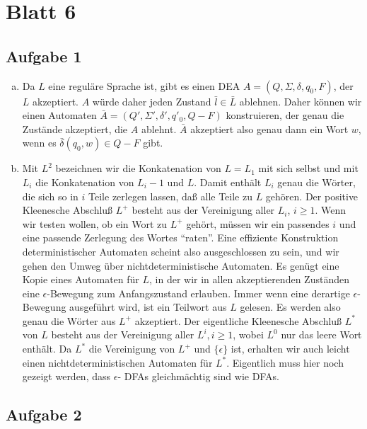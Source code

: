 \section*{Blatt 6}
%

\subsection*{Aufgabe 1}

\begin{enumerate}[a)]
  \item Da $L$ eine reguläre Sprache ist, gibt es einen DEA $A = (Q, \Sigma, \delta, q_0, F)$, der $L$ akzeptiert. $A$ würde daher jeden Zustand $\bar{l} \in \bar{L}$ ablehnen. Daher können wir einen Automaten $\bar{A} = (Q', \Sigma', \delta', q'_0, Q-F)$ konstruieren, der genau die Zustände akzeptiert, die $A$ ablehnt. $\bar{A}$ akzeptiert also genau dann ein Wort $w$, wenn es $\bar{\delta}(q_0, w) \in Q-F$ gibt.

  \item Mit $L^2$ bezeichnen wir die Konkatenation von
   $L = L_1$ mit sich selbst und mit $L_i$ die Konkatenation
   von $L_i-1$ und $L$. Damit enthält $L_i$ genau die Wörter,
    die sich so in $i$ Teile zerlegen lassen, daß alle Teile
    zu $L$ gehören. Der positive Kleenesche Abschluß $L^{+}$
    besteht aus der Vereinigung aller $L_i$, $i \geq 1$. Wenn
     wir testen wollen, ob ein Wort zu $L^{+}$ gehört, müssen
     wir ein passendes $i$ und eine passende Zerlegung des Wortes
      ``raten''. Eine effiziente Konstruktion deterministischer
      Automaten scheint also ausgeschlossen zu sein, und wir gehen
       den Umweg über nichtdeterministische Automaten. Es genügt
       eine Kopie eines Automaten für $L$, in der wir in allen
       akzeptierenden Zuständen eine $\epsilon$-Bewegung zum Anfangszustand
        erlauben. Immer wenn eine derartige $\epsilon$-Bewegung
        ausgeführt wird, ist ein Teilwort aus $L$ gelesen. Es werden
        also genau die Wörter aus $L^{+}$ akzeptiert. Der eigentliche
         Kleenesche Abschluß $L^{*}$ von $L$ besteht aus der Vereinigung
         aller $L^{i}, i \geq 1$, wobei $L^{0}$ nur das leere Wort enthält.
         Da $L^{*}$ die Vereinigung von $L^{+}$
 und $\{\epsilon\}$ ist, erhalten wir auch leicht einen nichtdeterministischen
 Automaten für $L^{*}$. Eigentlich muss hier noch gezeigt werden, dass $\epsilon$- DFAs gleichmächtig sind wie DFAs.
\end{enumerate}

\subsection*{Aufgabe 2}


